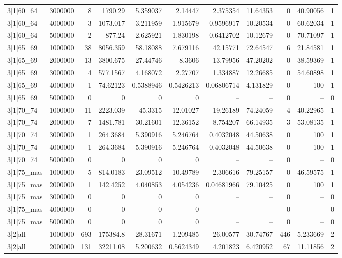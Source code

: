 \begin{tabular}{lrrrrrrrrrr}
3|1|60\_64 & 3000000 & 8 & 1790.29 & 5.359037 & 2.14447 & 2.375354 & 11.64353 & 0 & 40.90056 & 1 \\
3|1|60\_64 & 4000000 & 3 & 1073.017 & 3.211959 & 1.915679 & 0.9596917 & 10.20534 & 0 & 60.62034 & 1 \\
3|1|60\_64 & 5000000 & 2 & 877.24 & 2.625921 & 1.830198 & 0.6412702 & 10.12679 & 0 & 70.71097 & 1 \\
3|1|65\_69 & 1000000 & 38 & 8056.359 & 58.18088 & 7.679116 & 42.15771 & 72.64547 & 6 & 21.84581 & 1 \\
3|1|65\_69 & 2000000 & 13 & 3800.675 & 27.44746 & 8.3606 & 13.79956 & 47.20202 & 0 & 38.59369 & 1 \\
3|1|65\_69 & 3000000 & 4 & 577.1567 & 4.168072 & 2.27707 & 1.334887 & 12.26685 & 0 & 54.60898 & 1 \\
3|1|65\_69 & 4000000 & 1 & 74.62123 & 0.5388946 & 0.5426213 & 0.06806714 & 4.131829 & 0 & 100 & 1 \\
3|1|65\_69 & 5000000 & 0 & 0 & 0 & 0 & -- & -- & 0 & -- & 0 \\
3|1|70\_74 & 1000000 & 11 & 2223.039 & 45.3315 & 12.01027 & 19.26189 & 74.24059 & 4 & 40.22965 & 1 \\
3|1|70\_74 & 2000000 & 7 & 1481.781 & 30.21601 & 12.36152 & 8.754207 & 66.14935 & 3 & 53.08135 & 1 \\
3|1|70\_74 & 3000000 & 1 & 264.3684 & 5.390916 & 5.246764 & 0.4032048 & 44.50638 & 0 & 100 & 1 \\
3|1|70\_74 & 4000000 & 1 & 264.3684 & 5.390916 & 5.246764 & 0.4032048 & 44.50638 & 0 & 100 & 1 \\
3|1|70\_74 & 5000000 & 0 & 0 & 0 & 0 & -- & -- & 0 & -- & 0 \\
3|1|75\_mas & 1000000 & 5 & 814.0183 & 23.09512 & 10.49789 & 2.306616 & 79.25157 & 0 & 46.59575 & 1 \\
3|1|75\_mas & 2000000 & 1 & 142.4252 & 4.040853 & 4.054236 & 0.04681966 & 79.10425 & 0 & 100 & 1 \\
3|1|75\_mas & 3000000 & 0 & 0 & 0 & 0 & -- & -- & 0 & -- & 0 \\
3|1|75\_mas & 4000000 & 0 & 0 & 0 & 0 & -- & -- & 0 & -- & 0 \\
3|1|75\_mas & 5000000 & 0 & 0 & 0 & 0 & -- & -- & 0 & -- & 0 \\
3|2|all & 1000000 & 693 & 175384.8 & 28.31671 & 1.209485 & 26.00577 & 30.74767 & 446 & 5.233669 & 2 \\
3|2|all & 2000000 & 131 & 32211.08 & 5.200632 & 0.5624349 & 4.201823 & 6.420952 & 67 & 11.11856 & 2 \\

\end{tabular}

